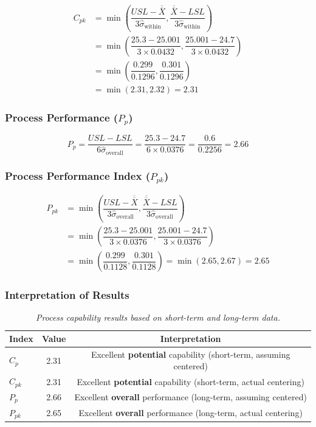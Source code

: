 \documentclass[twoside]{book}
\begin{document}
\begin{align*}
C_{pk} &= \min\left(\dfrac{USL - \overline{\overline{X}}}{3\hat{\sigma}_{\text{within}}}, \dfrac{\overline{\overline{X}} - LSL}{3\hat{\sigma}_{\text{within}}}\right)\\
&= \min\left(\dfrac{25.3 - 25.001}{3 \times 0.0432}, \dfrac{25.001 - 24.7}{3 \times 0.0432}\right)\\
&= \min\left(\dfrac{0.299}{0.1296}, \dfrac{0.301}{0.1296}\right)\\
&= \min(2.31, 2.32) = 2.31
\end{align*}

\subsubsection{Process Performance (\texorpdfstring{$P_p$}{Pp})}

\[
P_p = \dfrac{USL - LSL}{6\hat{\sigma}_{\text{overall}}} = \dfrac{25.3 - 24.7}{6 \times 0.0376} = \dfrac{0.6}{0.2256} = 2.66
\]

\subsubsection{Process Performance Index (\texorpdfstring{$P_{pk}$}{Ppk})}

\begin{align*}
P_{pk} &= \min\left(\dfrac{USL - \overline{\overline{X}}}{3\hat{\sigma}_{\text{overall}}}, \dfrac{\overline{\overline{X}} - LSL}{3\hat{\sigma}_{\text{overall}}}\right)\\
&= \min\left(\dfrac{25.3 - 25.001}{3 \times 0.0376}, \dfrac{25.001 - 24.7}{3 \times 0.0376}\right)\\
&= \min\left(\dfrac{0.299}{0.1128}, \dfrac{0.301}{0.1128}\right)
= \min(2.65, 2.67) = 2.65
\end{align*}
\subsubsection{Interpretation of Results}

\begin{table}[H]
\centering
\begin{tabular}{l|c|c}
\toprule
\textbf{Index} & \textbf{Value} & \textbf{Interpretation} \\
\midrule
$C_p$ & 2.31 & Excellent \textbf{potential} capability (short-term, assuming centered) \\
$C_{pk}$ & 2.31 & Excellent \textbf{potential} capability (short-term, actual centering) \\
$P_p$ & 2.66 & Excellent \textbf{overall} performance (long-term, assuming centered) \\
$P_{pk}$ & 2.65 & Excellent \textbf{overall} performance (long-term, actual centering) \\
\bottomrule
\end{tabular}
\caption{\textit{Process capability results based on short-term and long-term data.}}
\end{table}
\end{document}
